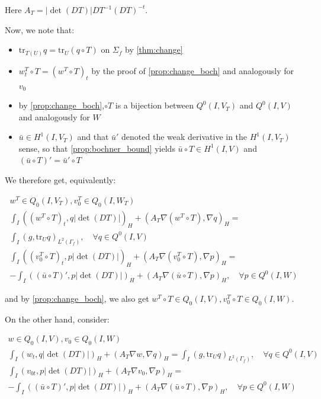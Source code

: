 \documentclass[english,a4paper,12pt,oneside]{scrbook}
\theoremstyle{break}
\theoremstyle{remark}
\newcommand{\tr}{\text{tr}}
\newcommand{\tred}[1]{\textcolor{red}{#1}}
\begin{document}
Here $A_T = |\det(DT)|DT^{-1}(DT)^{-t}$.

Now, we note that:

\begin{itemize}
	\item $\tr_{T(U)} q = \tr_U(q\circ T)$ on $\Sigma_f$ by \cref{thm:change}
	\item $w_t^T\circ T = (w^T\circ T)_t$ by the proof of \cref{prop:change_boch} and analogously for $v_0$
	\item by \cref{prop:change_boch},$\circ T$ is a bijection between $Q^0(I,V_T)$ and $Q^0(I,V)$ and analogously for $W$
	\item $\bar{u} \in H^1(I,V_T)$ and that $\bar{u}'$ denoted the weak derivative in the $H^1(I,V_T)$ sense, so that \ref{prop:bochner_bound} yields $\bar{u}\circ T \in H^1(I,V)$ and $(\bar{u}\circ T )' = \bar{u}'\circ T $
\end{itemize}

We therefore get, equivalently:

\begin{align*}
w^T \in Q_0(I, V_T), v_0^T \in Q_0(I,W_T) \\
\int_I ( (w^T\circ T)_t , q |\det(DT)|)_H+ (A_T\nabla (w^T\circ T), \nabla q)_{H} =\\ \int_I(g,\tr_{U} q)_{L^2(\Gamma_f)}, \quad \forall q \in Q^0(I, V) \\
\int_I ( (v_0^T\circ T)_t,p |\det(DT)|)_H + (A_T \nabla (v_0^T\circ T), \nabla p)_{H}=\\ -\int_I((\bar{u}\circ T)',p|\det(DT)|)_{H}+(A_T \nabla (\bar{u} \circ T), \nabla p)_{H}, \quad \forall p \in Q^0(I, W)
\end{align*}

and by \cref{prop:change_boch}, we also get $w^T\circ T \in Q_0(I,V), v_0^T\circ T \in Q_0(I,W)$.


On the other hand, consider:

\begin{align*}
w \in Q_0(I, V), v_0 \in Q_0(I,W) \\
\int_I ( w_t , q |\det(DT)|)_H+ (A_T\nabla w, \nabla q)_{H} =\int_I(g,\tr_{U} q)_{L^2(\Gamma_f)}, \quad \forall q \in Q^0(I, V) \\
\int_I ( v_{0t},p |\det(DT)|)_H + (A_T \nabla v_0, \nabla p)_{H}=\\ -\int_I((\bar{u}\circ T)',p|\det(DT)|)_{H}+(A_T \nabla (\bar{u} \circ T), \nabla p)_{H}, \quad \forall p \in Q^0(I, W)
\end{align*}
\end{document}
